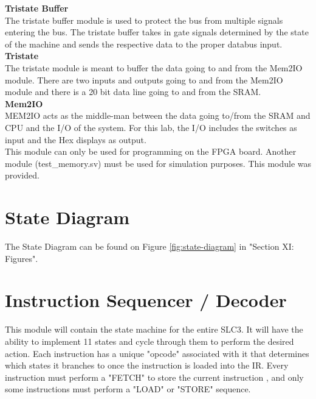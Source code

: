 \documentclass[journal, twocolumn, final,11pt,letterpaper]{IEEEtran}
\begin{document}
\normalsize\textbf{Tristate Buffer} \\

The tristate buffer module is used to protect the bus from multiple signals entering the bus.  The tristate buffer takes in gate signals determined by the state of the machine and sends the respective data to the proper databus input. \\

\normalsize\textbf{Tristate} \\

The tristate module is meant to buffer the data going to and from the Mem2IO module. There are two inputs and outputs going to and from the Mem2IO module and there is a 20 bit data line going to and from the SRAM. \\

\normalsize\textbf{Mem2IO} \\

MEM2IO acts as the middle-man between the data going to/from the SRAM and CPU and the I/O of the system.  For this lab, the I/O includes the switches as input and the Hex displays as output. \\

This module can only be used for programming on the FPGA board. Another module (test\_memory.sv) must be used for simulation purposes. This module was provided.\\

\section{State Diagram}
The State Diagram can be found on Figure \ref{fig:state-diagram} in "Section XI: Figures".

\section{Instruction Sequencer / Decoder}
This module will contain the state machine for the entire SLC3. It will have the ability to implement 11 states and cycle through them to perform the desired action. Each instruction has a unique "opcode" associated with it that determines which states it branches to once the instruction is loaded into the IR.  Every instruction must perform a "FETCH" to store the current instruction , and only some instructions must perform a "LOAD" or "STORE" sequence. \\
\end{document}
